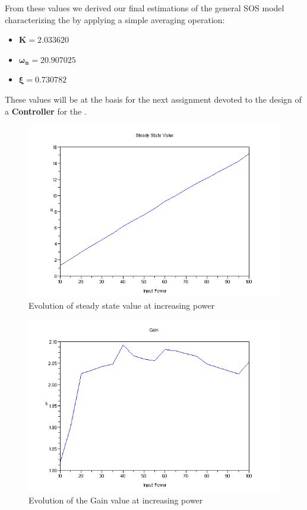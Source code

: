 From these values we derived our final estimations of the general SOS model characterizing the \LEGOMOTOR{} by applying a simple averaging operation:
\begin{itemize}
	\item $\mathbf{K} = 2.033620$
	\item $\mathbf{\omega_n} = 20.907025$
	\item $\mathbf{\xi} = 0.730782$
\end{itemize}

These values will be at the basis for the next assignment devoted to the design of a \textbf{Controller} for the \LEGOMOTOR{}.

\begin{figure}[htbp]
\center
  \includegraphics[scale=0.65]{FIGURES_1/steadystatevalue.png}
  \caption{Evolution of steady state value at increasing power}
  \label{fig:q_avg}
\end{figure}

\begin{figure}[htbp]
\center
  \includegraphics[scale=0.65]{FIGURES_1/Gain.png}
  \caption{Evolution of the Gain value at increasing power}
  \label{fig:k_avg}
\end{figure}

